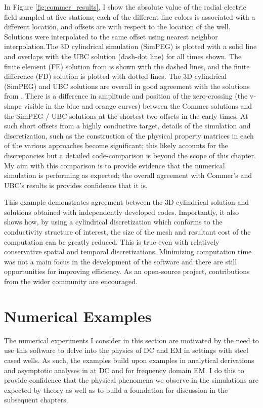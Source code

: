 In Figure \ref{fig:commer_results}, I show the absolute value of the radial electric field sampled at five stations; each of the different line colors is associated with a different location, and offsets are with respect to the location of the well. Solutions were interpolated to the same offset using nearest neighbor interpolation.The 3D cylindrical simulation (SimPEG) is plotted with a solid line and overlaps with the UBC solution (dash-dot line) for all times shown. The finite element (FE) solution from \cite{Commer2015} is shown with the dashed lines, and the finite difference (FD) solution is plotted with dotted lines. The 3D cylindrical (SimPEG) and UBC solutions are overall in good agreement with the solutions from \cite{Commer2015}. There is a difference in amplitude and position of the zero-crossing (the v-shape visible in the blue and orange curves) between the Commer solutions and the SimPEG / UBC solutions at the shortest two offsets in the early times. At such short offsets from a highly conductive target, details of the simulation and discretization, such as the construction of the physical property matrices in each of the various approaches become significant; this likely accounts for the discrepancies but a detailed code-comparison is beyond the scope of this chapter. My aim with this comparison is to provide evidence that the numerical simulation is performing as expected; the overall agreement with Commer's and UBC's results is provides confidence that it is.




This example demonstrates agreement between the 3D cylindrical solution and solutions obtained with independently developed codes. Importantly, it also shows how, by using a cylindrical discretization which conforms to the conductivity structure of interest, the size of the mesh and resultant cost of the computation can be greatly reduced. This is true even with relatively conservative spatial and temporal discretizations. Minimizing computation time was not a main focus in the development of the software and there are still opportunities for improving efficiency. As an open-source project, contributions from the wider community are encouraged.
\section{Numerical Examples}
\label{sec:numerical_examples}

The numerical experiments I consider in this section are motivated by the need to use this software to delve into the physics of DC and EM in settings with steel cased wells. As such, the examples build upon examples in analytical derivations and asymptotic analyses in \cite{Kaufman1990, Kaufman1993} at DC and \cite{Augustin1989} for frequency domain EM. I do this to provide confidence that the physical phenomena we observe in the simulations are expected by theory as well as to build a foundation for discussion in the subsequent chapters.
